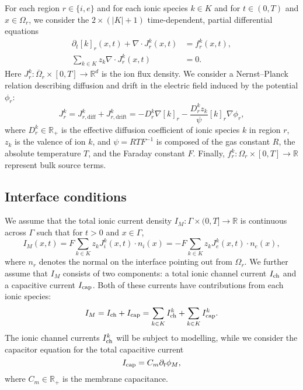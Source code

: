\documentclass[fleqn,10pt]{wlscirep}
\newcommand{\R}{\mathbb{R}}
\begin{document}
For each region $r \in \{i, e\}$ and for each ionic species $k \in K$ and for $t\in (0,T)$ and $x\in\Omega_r$, we consider the $2 \times (|K| + 1)$ time-dependent, partial differential equations
\begin{subequations}
  \begin{align}
    \partial_t [k]_r(x,t) + \nabla \cdot J_r^k(x,t) &= f_r^k(x,t), 
    \label{eq:conservation-ions} \\
    \sum_{k\in K}z_k \nabla \cdot J_r^k(x,t) &= 0 .
    \label{eq:knp}
  \end{align}
\end{subequations}
Here $J_r^k:\overline{\Omega}_r\times[0,T]\to\R^d$ is the ion flux density. We consider a Nernst--Planck relation describing diffusion and drift in the electric field induced by the potential $\phi_r$:
\begin{equation}
  J_r^k = J_{r,\mathrm{diff}}^k + J_{r,\mathrm{drift}}^k  
   = - D_r^k \nabla [k]_r - \frac{D_r^k z_k}{\psi} [k]_r \nabla \phi_r,
  \label{eq:flux}
\end{equation}
where $D_r^k\in\R_+$ is the effective diffusion coefficient of ionic species $k$ in region $r$, $z_k$ is the valence of ion $k$, and $\psi = R T F^{-1}$ is composed of the gas constant $R$, the absolute temperature $T$, and the Faraday constant $F$. Finally, $f_r^k:\Omega_r\times[0,T]\to\R$ represent bulk source terms. 

\subsection{Interface conditions}

We assume that the total ionic current density $I_M:\Gamma\times(0,T]\to\R$ is continuous across $\Gamma$ such that for $t > 0$ and $x \in \Gamma$,
\begin{equation}\label{eq::I_M1}
  I_M(x,t) = F \sum_{k \in K} z_k J_i^k(x,t) \cdot n_i(x) = - F \sum_{k \in K} z_k J_e^k(x,t) \cdot n_e(x),
\end{equation}
where $n_r$ denotes the normal on the interface pointing out from $\Omega_r$. We further assume that $I_M$ consists of two components: a total ionic channel current $I_{\rm ch}$ and a capacitive current $I_{\rm cap}$. Both of these currents have contributions from each ionic species: 
\begin{equation}\label{eq::I_M2}
I_M = I_{\rm ch} + I_{\rm cap} = \sum_{k \in K} I_{\rm ch}^k + \sum_{k \in K} I_{\rm cap}^k .
\end{equation}
The ionic channel currents $I_{\rm ch}^k$ will be subject to modelling, while we consider the capacitor equation for the total capacitive current
\begin{equation}
I_{\rm cap} = C_m \partial_t \phi_M ,
\end{equation}
where $C_m\in\R_+$ is the membrane capacitance. 
\end{document}
